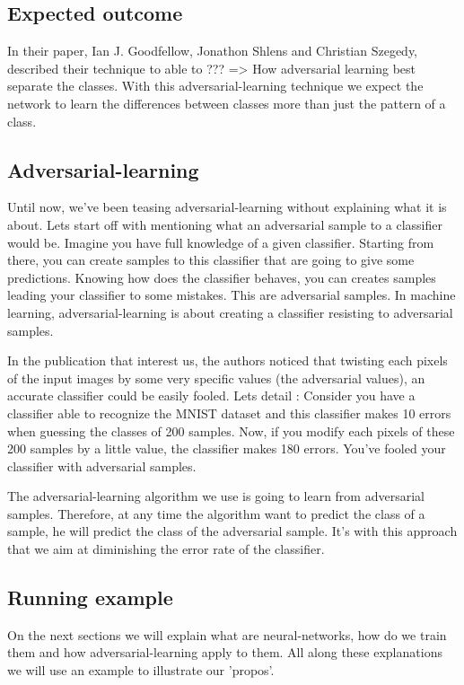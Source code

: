 	\subsection{Expected outcome}
		In their paper, Ian J. Goodfellow, Jonathon Shlens and Christian Szegedy, described their technique to able to ??? 
		=> How adversarial learning best separate the classes.
		With this adversarial-learning technique we expect the network to learn the differences between classes more than just the pattern of a class.


	\subsection{Adversarial-learning}
		Until now, we've been teasing adversarial-learning without explaining what it is about. Lets start off with mentioning what an adversarial sample to a classifier would be. Imagine you have full knowledge of a given classifier. Starting from there, you can create samples to this classifier that are going to give some predictions. Knowing how does the classifier behaves, you can creates samples leading your classifier to some mistakes. This are adversarial samples. In machine learning, adversarial-learning is about creating a classifier resisting to adversarial samples.

		In the publication that interest us\cite{goodfellow2014explaining}, the authors noticed that twisting each pixels of the input images by some very specific values (the adversarial values), an accurate classifier could be easily fooled. Lets detail : Consider you have a classifier able to recognize the MNIST dataset and this classifier makes 10 errors when guessing the classes of 200 samples. Now, if you modify each pixels of these 200 samples by a little value, the classifier makes 180 errors. You've fooled your classifier with adversarial samples.

		The adversarial-learning algorithm we use is going to learn from adversarial samples. Therefore, at any time the algorithm want to predict the class of a sample, he will predict the class of the adversarial sample. It's with this approach that we aim at diminishing the error rate of the classifier.


	\subsection{Running example}
		On the next sections we will explain what are neural-networks, how do we train them and how adversarial-learning apply to them. All along these explanations we will use an example to illustrate our 'propos'.



